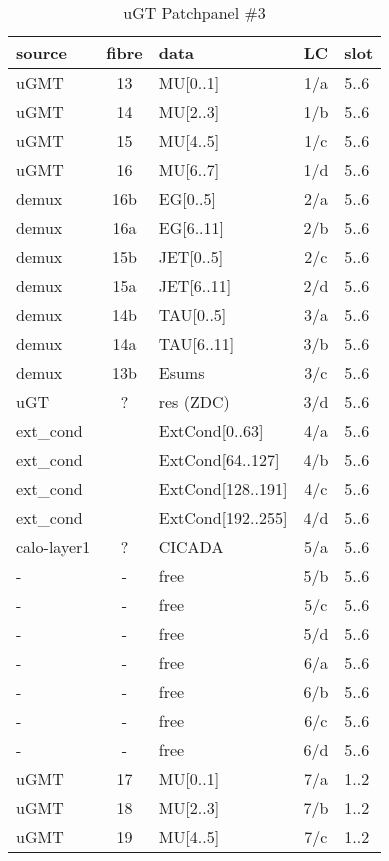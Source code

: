 \begin{longtable}{|l|c|l|c|l|}
\caption{uGT Patchpanel \#3}
    \label{tab:app:ugt_opt_pp_2}\\
\hline
\textbf{source}& \textbf{fibre}& \textbf{data}& \textbf{LC}& \textbf{slot}\\
\hline
\hline
\endhead
uGMT  & 13  & MU[0..1]   & 1/a  & 5..6 \\\hline
uGMT  & 14  & MU[2..3]   & 1/b  & 5..6 \\\hline
uGMT  & 15  & MU[4..5]   & 1/c  & 5..6 \\\hline
uGMT  & 16  & MU[6..7]   & 1/d  & 5..6 \\\hline
demux & 16b & EG[0..5]   & 2/a  & 5..6 \\\hline
demux & 16a & EG[6..11]  & 2/b  & 5..6 \\\hline
demux & 15b & JET[0..5]  & 2/c  & 5..6 \\\hline
demux & 15a & JET[6..11] & 2/d  & 5..6 \\\hline
demux & 14b & TAU[0..5]  & 3/a  & 5..6 \\\hline
demux & 14a & TAU[6..11] & 3/b  & 5..6 \\\hline
demux & 13b & Esums      & 3/c  & 5..6 \\\hline
uGT   & ?   & res (ZDC)  & 3/d  & 5..6 \\\hline
ext\_cond &     & ExtCond[0..63]    & 4/a  & 5..6 \\\hline
ext\_cond &     & ExtCond[64..127]  & 4/b  & 5..6 \\\hline
ext\_cond &     & ExtCond[128..191] & 4/c  & 5..6 \\\hline
ext\_cond &     & ExtCond[192..255] & 4/d  & 5..6 \\\hline
calo-layer1 & ? & CICADA & 5/a  & 5..6 \\\hline
- & - & free & 5/b  & 5..6 \\\hline
- & - & free & 5/c  & 5..6 \\\hline
- & - & free & 5/d  & 5..6 \\\hline
- & - & free & 6/a  & 5..6 \\\hline
- & - & free & 6/b  & 5..6 \\\hline
- & - & free & 6/c  & 5..6 \\\hline
- & - & free & 6/d  & 5..6 \\\hline
\hline
uGMT  & 17  & MU[0..1]   & 7/a  & 1..2 \\\hline
uGMT  & 18  & MU[2..3]   & 7/b  & 1..2 \\\hline
uGMT  & 19  & MU[4..5]   & 7/c  & 1..2 \\\hline

\end{longtable}
